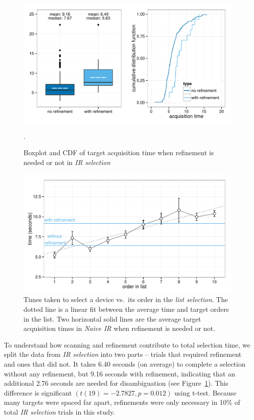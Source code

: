 \begin{figure}[t]
\centering
\includegraphics[width=0.95\columnwidth]{figures/result_study1b.pdf}
\caption{Boxplot and CDF of target acquisition time when refinement is needed or not in {\em IR selection}}.
\label{fig:with_without_refinement}
\end{figure}

\begin{figure}[t]
\centering
\includegraphics[width=0.95\columnwidth]{figures/result_study1c.pdf}
\caption{Times taken to select a device vs.~its order in the {\em list selection}. The dotted line is a linear fit between the average time and target orders in the list. Two horizontal solid lines are the average target acquisition times in {\em Naive IR} when refinement is needed or not.}
\label{fig:time-vs-list-order}
\end{figure}

To understand how scanning and refinement contribute to total selection time, we split the data from {\em IR selection} into two parts -- trials that required refinement and ones that did not. It takes 6.40 seconds (on average) to complete  a selection without any refinement, but 9.16 seconds with refinement, indicating that an additional 2.76 seconds are needed for disambiguation (see Figure~\ref{fig:with_without_refinement}). This difference is significant $(t(19)=-2.7827, p=0.012)$ using t-test.
Because many targets were spaced far apart, refinements were only necessary in 10\% of total {\em IR selection} trials in this study.

